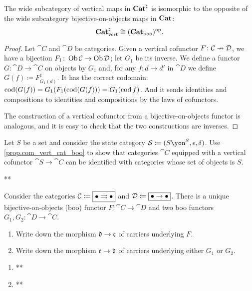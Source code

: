 \documentclass[Book-Poly]{subfiles}
\begin{document}
\begin{proposition}\label{prop.com_vert_cat_boo}
The wide subcategory of vertical maps in $\mathbf{Cat}^\sharp$ is isomorphic to the opposite of the wide subcategory bijective-on-objects maps in $\mathbf{Cat}$:
\[
\mathbf{Cat}^\sharp_{\text{vert}}\cong(\mathbf{Cat}_{\text{boo}})^{\textnormal{op}}.
\]
\end{proposition}
\begin{proof}
Let $\cat{C}$ and $\cat{D}$ be categories. Given a vertical cofunctor $F\colon\mathcal{C}\nrightarrow\mathcal{D}$, we have a bijection $F_1\colon\operatorname{Ob}\mathcal{C}\to\operatorname{Ob}\mathcal{D}$; let $G_1$ be its inverse. We define a functor $G\colon\cat{D}\to\cat{C}$ on objects by $G_1$ and, for any $f\colon d\to d'$ in $\cat{D}$ we define $G(f)\coloneqq F^\sharp_{G_1(d)}$. It has the correct codomain: $\operatorname{cod}(G(f))=G_1(F_1(\operatorname{cod}(G(f)))=G_1(\operatorname{cod} f)$. And it sends identities and compositions to identities and compositions by the laws of cofunctors.

The construction of a vertical cofunctor from a bijective-on-objects functor is analogous, and it is easy to check that the two constructions are inverses.
\end{proof}

\begin{exercise}
Let $S$ be a set and consider the state category $\cat{S}\coloneqq(S\yon^S,\epsilon,\delta)$. Use \cref{prop.com_vert_cat_boo} to show that categories $\cat{C}$ equipped with a vertical cofunctor $\cat{S}\to\cat{C}$ can be identified with categories whose set of objects is $S$.
\begin{solution}
**
\end{solution}
\end{exercise}

\begin{exercise}
Consider the categories $\mathcal{C}\coloneqq\fbox{$\bullet\rightrightarrows\bullet$}$ and $\mathcal{D}\coloneqq\fbox{$\bullet\to\bullet$}$. There is a unique bijective-on-objects (boo) functor $F\colon\cat{C}\to\cat{D}$ and two boo functors $G_1,G_2\colon\cat{D}\to\cat{C}$.
\begin{enumerate}
	\item Write down the morphism $\mathfrak{d}\to\mathfrak{c}$ of carriers underlying $F$.
	\item Write down the morphism $\mathfrak{c}\to\mathfrak{d}$ of carriers underlying either $G_1$ or $G_2$.
\qedhere
\end{enumerate}
\begin{solution}
\begin{enumerate}
    \item **
    \item **
\end{enumerate}
\end{solution}
\end{exercise}
\end{document}
